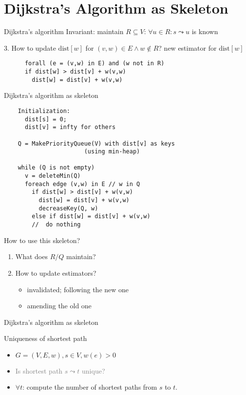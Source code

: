 \section{Dijkstra's Algorithm as Skeleton}

\begin{frame}[fragile]{Dijkstra's algorithm}
  Invariant: maintain $R \subseteq V$: $\forall u \in R: s \leadsto u$ is known
  \begin{exampleblock}{3. How to update $\text{dist}[w]$ for $(v,w) \in E \land w \notin R$?}
    new estimator for $\text{dist}[w]$
    \begin{verbatim}
      forall (e = (v,w) in E) and (w not in R)
      if dist[w] > dist[v] + w(v,w)
        dist[w] = dist[v] + w(v,w)
    \end{verbatim}
  \end{exampleblock}
\end{frame}
\begin{frame}[fragile]{Dijkstra's algorithm as skeleton}
  \begin{verbatim}
    Initialization: 
      dist[s] = 0;
      dist[v] = infty for others

    Q = MakePriorityQueue(V) with dist[v] as keys 
                       (using min-heap)

    while (Q is not empty)
      v = deleteMin(Q)
      foreach edge (v,w) in E // w in Q
        if dist[w] > dist[v] + w(v,w)
          dist[w] = dist[v] + w(v,w)
          decreaseKey(Q, w)
        else if dist[w] = dist[v] + w(v,w)
        //  do nothing
  \end{verbatim}

  \begin{alertblock}{How to use this skeleton?}
    \begin{enumerate}
      \item What does $R/Q$ maintain?
      \item How to update estimators?
	\begin{itemize}
	  \item invalidated; following the new one
	  \item amending the old one
	\end{itemize}
    \end{enumerate}
  \end{alertblock}
\end{frame}
\begin{frame}[fragile]{Dijkstra's algorithm as skeleton}
  \begin{exampleblock}{Uniqueness of shortest path }
    \begin{itemize}
      \item $G = (V, E, w), s \in V, w(e) > 0$
      \item \textcolor{gray}{Is shortest path $s \leadsto t$ unique?}
      \item $\forall t$: compute the number of shortest paths from $s$ to $t$.
    \end{itemize}
  \end{exampleblock}
\end{frame}
